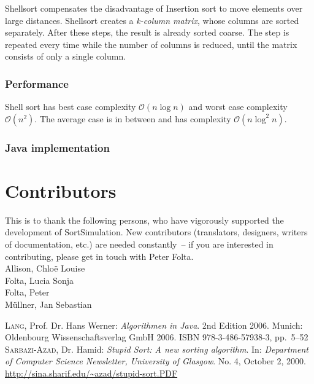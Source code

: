 \documentclass[]{pfBook}
\newcommand{\OO}{\mathcal{O}}
\begin{document}
	Shellsort compensates the disadvantage of Insertion sort to move elements over large distances. Shellsort creates a \emph{k-column matrix}, whose columns are sorted separately. After these steps, the result is already sorted coarse. The step is repeated every time while the number of columns is reduced, until the matrix consists of only a single column.
	
	\subsubsection{Performance}
	
	Shell sort has best case complexity $\OO(n \log n)$ and worst case complexity $\OO(n^2)$. The average case is in between and has complexity $\OO(n \log^2 n)$.
	
	\subsubsection{Java implementation}
	
	
	
	\section{Contributors}
	
	This is to thank the following persons, who have vigorously supported the development of SortSimulation. New contributors (translators, designers, writers of documentation, etc.) are needed constantly~-- if you are interested in contributing, please get in touch with Peter Folta.\\
	[\baselineskip]
	Allison, Chloë Louise\\
	Folta, Lucia Sonja\\
	Folta, Peter\\
	Müllner, Jan Sebastian
	
	\begin{thebibliography}{99}
			\textsc{Lang}, Prof. Dr. Hans Werner: \emph{Algorithmen in Java}. 2nd Edition 2006. Munich: Oldenbourg Wissenschaftsverlag GmbH 2006. ISBN 978-3-486-57938-3, pp.~5--52
			\textsc{Sarbazi-Azad}, Dr. Hamid: \emph{Stupid Sort: A new sorting algorithm}. In: \emph{Department of Computer Science Newsletter, University of Glasgow}. No. 4, October 2, 2000. \href{http://sina.sharif.edu/~azad/stupid-sort.PDF}{http://sina.sharif.edu/\~{}azad/stupid-sort.PDF}
	\end{thebibliography}
	
	\makelistoffigures
	\makelistoflistings
\end{document}

